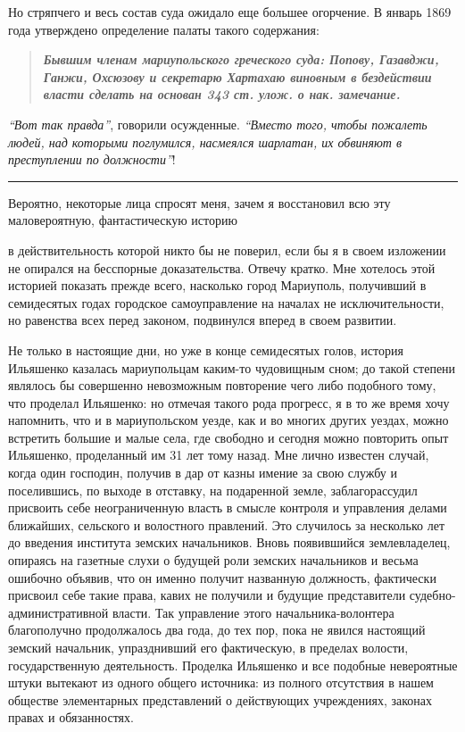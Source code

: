 \documentclass[a4paper,20pt]{report}
\begin{document}
Но стряпчего и весь состав суда ожидало еще большее огорчение. В январь 
1869 года утверждено определение
палаты такого содержания: 

\begin{quote}
\em\bfseries
Бывшим членам мариупольского
греческого суда: Попову, Газавджи, Ганжи, Охсюзову и
секретарю Хартахаю виновным в бездействии власти сделать на основан 343 ст. улож. о нак. замечание.
\end{quote}

\emph{``Вот так правда''}, говорили осужденные. \emph{``Вместо того, чтобы пожалеть людей, 
над которыми поглумился, насмеялся шарлатан, их обвиняют в преступлении по должности''}!

\par\noindent\rule{\textwidth}{0.4pt}

Вероятно, некоторые лица спросят меня, зачем я
восстановил всю эту маловероятную, фантастическую историю

в действительность которой никто бы не поверил, если бы я в своем изложении 
не опирался на бесспорные доказательства. Отвечу кратко. Мне хотелось этой историей
показать прежде всего, насколько город Мариуполь, получивший в 
семидесятых годах городское самоуправление
на началах не исключительности, но равенства всех перед законом, подвинулся вперед в своем развитии. 

Не только в настоящие дни, но уже в конце семидесятых голов, история Ильяшенко
казалась мариупольцам каким-то чудовищным сном; до такой степени являлось бы
совершенно невозможным повторение чего либо подобного тому, что проделал
Ильяшенко: но отмечая такого рода прогресс, я в то же время хочу напомнить, что
и в мариупольском уезде, как и во многих других уездах, можно встретить большие
и малые села, где свободно и сегодня можно повторить опыт Ильяшенко,
проделанный им 31 лет тому назад. Мне лично известен случай, когда
один господин, получив в дар от казны имение за
свою службу и поселившись, по выходе в отставку,
на подаренной земле, заблагорассудил присвоить себе неограниченную власть 
в смысле контроля и управления делами
ближайших, сельского и волостного правлений. Это случилось
за несколько лет до введения института земских начальников. 
Вновь появившийся землевладелец, опираясь на
газетные слухи о будущей роли земских начальников и
весьма ошибочно объявив, что он именно получит названную должность, 
фактически присвоил себе такие права,
кавих не получили и будущие представители судебно-административной
власти. Так управление этого начальника-волонтера 
благополучно продолжалось два года, до тех пор,
пока не явился настоящий земский начальник, упразднивший
его фактическую, в пределах волости, государственную деятельность.
Проделка Ильяшенко и все подобные невероятные штуки вытекают из одного общего источника:
из полного отсутствия в нашем обществе элементарных
представлений о действующих учреждениях, законах правах и обязанностях.
\end{document}
